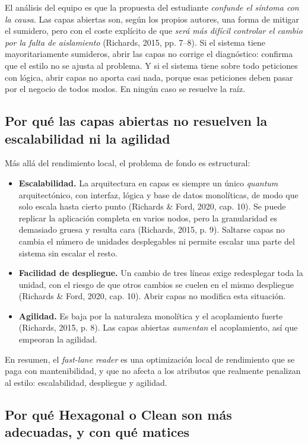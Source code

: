 \documentclass[11pt,a4paper]{article}
\begin{document}
El análisis del equipo es que la propuesta del estudiante \emph{confunde el síntoma con la causa}. Las capas abiertas son, según los propios autores, una forma de mitigar el sumidero, pero con el coste explícito de que \emph{será más difícil controlar el cambio por la falta de aislamiento} (Richards, 2015, pp. 7--8). Si el sistema tiene mayoritariamente sumideros, abrir las capas no corrige el diagnóstico: confirma que el estilo no se ajusta al problema. Y si el sistema tiene sobre todo peticiones con lógica, abrir capas no aporta casi nada, porque esas peticiones deben pasar por el negocio de todos modos. En ningún caso se resuelve la raíz.

\subsection{Por qué las capas abiertas no resuelven la escalabilidad ni la agilidad}

Más allá del rendimiento local, el problema de fondo es estructural:

\begin{itemize}[leftmargin=1.5em]
  \item \textbf{Escalabilidad.} La arquitectura en capas es siempre un único \emph{quantum} arquitectónico, con interfaz, lógica y base de datos monolíticas, de modo que solo escala hasta cierto punto (Richards \& Ford, 2020, cap. 10). Se puede replicar la aplicación completa en varios nodos, pero la granularidad es demasiado gruesa y resulta cara (Richards, 2015, p. 9). Saltarse capas no cambia el número de unidades desplegables ni permite escalar una parte del sistema sin escalar el resto.
  \item \textbf{Facilidad de despliegue.} Un cambio de tres líneas exige redesplegar toda la unidad, con el riesgo de que otros cambios se cuelen en el mismo despliegue (Richards \& Ford, 2020, cap. 10). Abrir capas no modifica esta situación.
  \item \textbf{Agilidad.} Es baja por la naturaleza monolítica y el acoplamiento fuerte (Richards, 2015, p. 8). Las capas abiertas \emph{aumentan} el acoplamiento, así que empeoran la agilidad.
\end{itemize}

En resumen, el \emph{fast-lane reader} es una optimización local de rendimiento que se paga con mantenibilidad, y que no afecta a los atributos que realmente penalizan al estilo: escalabilidad, despliegue y agilidad.

\subsection{Por qué Hexagonal o Clean son más adecuadas, y con qué matices}
\end{document}
